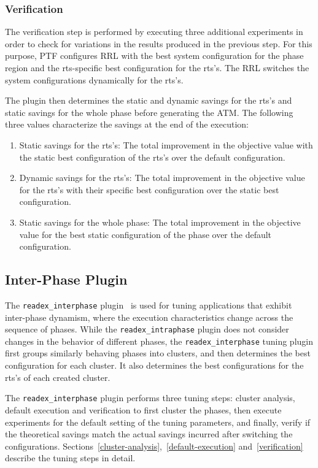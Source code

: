 \subsubsection{Verification} \label{intra-verification} 

The verification step is performed by executing three additional experiments in order to check for variations in the results produced in the previous step. For this purpose, PTF configures RRL with the best system configuration for the phase region and the rts-specific best configuration for the rts's. The RRL switches the system configurations dynamically for the rts's.

The plugin then determines the static and dynamic savings for the rts's and static savings for the whole phase before generating the ATM. The following three values characterize the savings at the end of the execution:

\begin{enumerate}
	\item Static savings for the rts's: The total improvement in the objective value with the static best configuration of the rts's over the default configuration. 
	\item Dynamic savings for the rts's: The total improvement in the objective value for the rts's with their specific best configuration over the static best configuration.
	\item Static savings for the whole phase: The total improvement in the objective value for the best static configuration of the phase over the default configuration.
\end{enumerate}


\subsection{Inter-Phase Plugin} \label{sec:inter-phase}

The \texttt{readex\_interphase} plugin~\cite{PDPTA_18_Kumaraswamy} is used for tuning applications that exhibit inter-phase dynamism, where the execution characteristics change across the sequence of phases. While the \texttt{readex\_intraphase} plugin does not consider changes in the behavior of different phases, the \texttt{readex\_interphase} tuning plugin first groups similarly behaving phases into clusters, and then determines the best configuration for each cluster. It also determines the best configurations for the rts's of each created cluster.

The \texttt{readex\_interphase} plugin performs three tuning steps: cluster analysis, default execution and verification to first cluster the phases, then execute experiments for the default setting of the tuning parameters, and finally, verify if the theoretical savings match the actual savings incurred after switching the configurations. Sections~\ref{cluster-analysis},~\ref{default-execution} and~\ref{verification} describe the tuning steps in detail.

